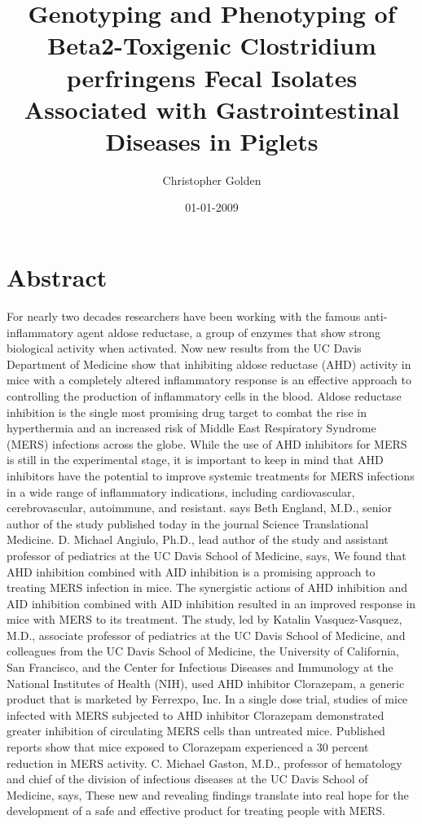 \documentclass{article}%
\title{Genotyping and Phenotyping of Beta2{-}Toxigenic Clostridium perfringens Fecal Isolates Associated with Gastrointestinal Diseases in Piglets}%
\author{Christopher Golden}%
\affil{School of Medicine, Chung Shan Medical University, 110 Chien{-}Kuo N. Road, Section 1, Taichung 402, Taiwan}%
\date{01{-}01{-}2009}%
\begin{document}
%
\normalsize%
\maketitle%
\section{Abstract}%
\label{sec:Abstract}%
For nearly two decades researchers have been working with the famous anti{-}inflammatory agent aldose reductase, a group of enzymes that show strong biological activity when activated. Now new results from the UC Davis Department of Medicine show that inhibiting aldose reductase (AHD) activity in mice with a completely altered inflammatory response is an effective approach to controlling the production of inflammatory cells in the blood.\newline%
Aldose reductase inhibition is the single most promising drug target to combat the rise in hyperthermia and an increased risk of Middle East Respiratory Syndrome (MERS) infections across the globe. While the use of AHD inhibitors for MERS is still in the experimental stage, it is important to keep in mind that AHD inhibitors have the potential to improve systemic treatments for MERS infections in a wide range of inflammatory indications, including cardiovascular, cerebrovascular, autoimmune, and resistant. says Beth England, M.D., senior author of the study published today in the journal Science Translational Medicine.\newline%
D. Michael Angiulo, Ph.D., lead author of the study and assistant professor of pediatrics at the UC Davis School of Medicine, says, We found that AHD inhibition combined with AID inhibition is a promising approach to treating MERS infection in mice. The synergistic actions of AHD inhibition and AID inhibition combined with AID inhibition resulted in an improved response in mice with MERS to its treatment.\newline%
The study, led by Katalin Vasquez{-}Vasquez, M.D., associate professor of pediatrics at the UC Davis School of Medicine, and colleagues from the UC Davis School of Medicine, the University of California, San Francisco, and the Center for Infectious Diseases and Immunology at the National Institutes of Health (NIH), used AHD inhibitor Clorazepam, a generic product that is marketed by Ferrexpo, Inc.\newline%
In a single dose trial, studies of mice infected with MERS subjected to AHD inhibitor Clorazepam demonstrated greater inhibition of circulating MERS cells than untreated mice. Published reports show that mice exposed to Clorazepam experienced a 30 percent reduction in MERS activity. C. Michael Gaston, M.D., professor of hematology and chief of the division of infectious diseases at the UC Davis School of Medicine, says, These new and revealing findings translate into real hope for the development of a safe and effective product for treating people with MERS.\newline%
\end{document}
